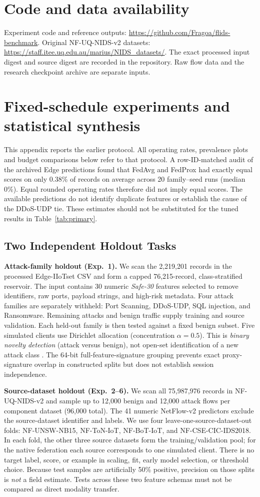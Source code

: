 \documentclass[journal,10pt]{IEEEtran}
\begin{document}
\section*{Code and data availability}
Experiment code and reference outputs: \url{https://github.com/Fragoa/flids-benchmark}. Original NF-UQ-NIDS-v2 datasets: \url{https://staff.itee.uq.edu.au/marius/NIDS_datasets/}. The exact processed input digest and source digest are recorded in the repository. Raw flow data and the research checkpoint archive are separate inputs.
\appendices\section{Fixed-schedule experiments and statistical synthesis}
This appendix reports the earlier protocol. All operating rates, prevalence plots and budget comparisons below refer to that protocol. A row-ID-matched audit of the archived Edge predictions found that FedAvg and FedProx had exactly equal scores on only 0.38\% of records on average across 20 family--seed runs (median 0\%). Equal rounded operating rates therefore did not imply equal scores. The available predictions do not identify duplicate features or establish the cause of the DDoS-UDP tie. These estimates should not be substituted for the tuned results in Table~\ref{tab:primary}.
\subsection{Two Independent Holdout Tasks}
\textbf{Attack-family holdout (Exp.~1).} We scan the 2,219,201 records in the processed Edge-IIoTset CSV and form a capped 76,215-record, class-stratified reservoir. The input contains 30 numeric \emph{Safe-30} features selected to remove identifiers, raw ports, payload strings, and high-risk metadata. Four attack families are separately withheld: Port Scanning, DDoS-UDP, SQL injection, and Ransomware. Remaining attacks and benign traffic supply training and source validation. Each held-out family is then tested against a fixed benign subset. Five simulated clients use Dirichlet allocation (concentration $\alpha=0.5$). This is \emph{binary novelty detection} (attack versus benign), not open-set identification of a new attack class \cite{bendale2016}. The 64-bit full-feature-signature grouping prevents exact proxy-signature overlap in constructed splits but does not establish session independence.

\textbf{Source-dataset holdout (Exp.~2--6).} We scan all 75,987,976 records in NF-UQ-NIDS-v2 and sample up to 12,000 benign and 12,000 attack flows per component dataset (96,000 total). The 41 numeric NetFlow-v2 predictors exclude the source-dataset identifier and labels. We use four leave-one-source-dataset-out folds: NF-UNSW-NB15, NF-ToN-IoT, NF-BoT-IoT, and NF-CSE-CIC-IDS2018. In each fold, the other three source datasets form the training/validation pool; for the native federation each source corresponds to one simulated client. There is no target label, score, or example in scaling, fit, early model selection, or threshold choice. Because test samples are artificially 50\% positive, precision on those splits is \emph{not} a field estimate. Tests across these two feature schemas must not be compared as direct modality transfer.
\end{document}
